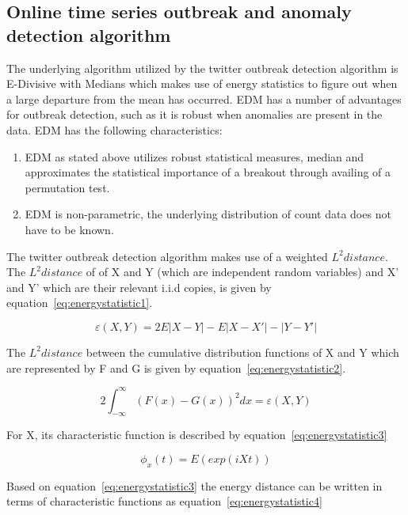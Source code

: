 \subsection{Online time series outbreak and anomaly detection algorithm}
The underlying algorithm utilized by the twitter outbreak detection algorithm \citep{twitterooutbreak} is E-Divisive with Medians \citep{james2014leveraging}  which makes use of energy statistics to figure out when a large departure from the mean has occurred. EDM has a number of advantages for outbreak detection, such as it is robust when anomalies are present in the data. EDM has the following characteristics:
\begin{enumerate}
\item EDM as stated above utilizes robust statistical measures, median and approximates the statistical importance of a breakout through availing of a permutation test.
\item EDM is non-parametric, the underlying distribution of count data does not have to be known.
\end{enumerate}

The twitter outbreak detection algorithm makes use of a weighted $L^{2} distance$. The $L^{2} distance$  of of X and Y (which are independent random variables) and X' and Y' which are their relevant i.i.d copies, is given by equation~\ref{eq:energystatistic1}.

\begin{equation} \varepsilon (X,Y) = 2E|X-Y|-E|X-X'|-|Y-Y'| \label{eq:energystatistic1}  \end{equation} 

The $L^{2} distance$  between the cumulative distribution functions of X and Y which are represented by F and G is given by equation~\ref{eq:energystatistic2}. 

\begin{equation} 
2\int_{-\infty}^{\infty} (F(x)-G(x))^2 dx = \varepsilon (X,Y)
\label{eq:energystatistic2}  \end{equation} 

For X, its characteristic function is described by equation~\ref{eq:energystatistic3}

\begin{equation} 
\phi_{x}(t)=E(exp(iXt))
\label{eq:energystatistic3}  \end{equation}

Based on equation~\ref{eq:energystatistic3} the energy distance can be written in terms of characteristic functions as equation~\ref{eq:energystatistic4} 

